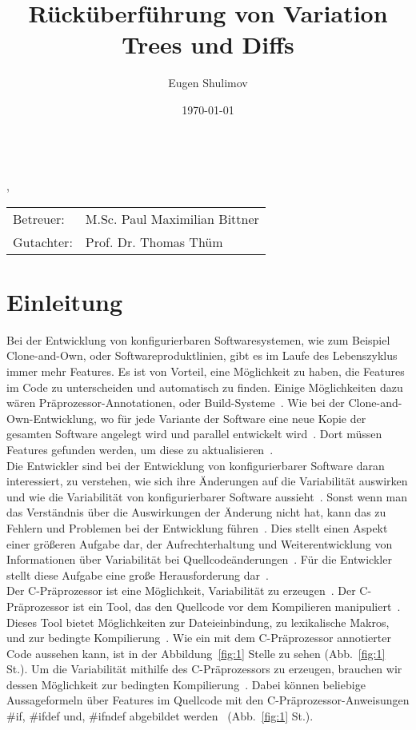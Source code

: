\documentclass[11pt,a4paper,oneside]{article}
\title{Rücküberführung von Variation Trees und Diffs}
\author{Eugen Shulimov}
\date{\today}
\newcommand*\numcircledtikz[1]{\tikz[baseline=(char.base)]{
		\node[circle,draw,double,inner sep=1.2pt] (char) {#1};}}
\begin{document}
	\makeatletter
	\begin{center}
		{\large\@title}\\
		\@author, \@date
	\end{center}
	\makeatother
	\vspace*{10pt}
	\begin{tabular}{ll}
		Betreuer:& M.Sc. Paul Maximilian Bittner\\
		Gutachter:& Prof. Dr. Thomas Thüm
	\end{tabular}

	\vspace{20pt}
	\section{Einleitung}
	Bei der Entwicklung von konfigurierbaren Softwaresystemen, wie zum Beispiel Clone-and-Own, oder Softwareproduktlinien, gibt es im Laufe des Lebenszyklus immer mehr Features. Es ist von Vorteil, eine Möglichkeit zu haben, die Features im Code zu unterscheiden und automatisch zu finden. Einige Möglichkeiten dazu wären Präprozessor-Annotationen, oder Build-Systeme~\cite{ABKS13}. Wie bei der Clone-and-Own-Entwicklung, wo für jede Variante der Software eine neue Kopie der gesamten Software angelegt wird und parallel entwickelt wird~\cite{BTS+:ESECFSE22}. Dort müssen Features gefunden werden, um diese zu aktualisieren~\cite{BTS+:ESECFSE22,KTSB:ICSE21,KB:VaMoS20,KB:ESECFSE20,KKK+:SPLC18,ZSL+:ICSE18}.\\
	
	
	
	Die Entwickler sind bei der Entwicklung von konfigurierbarer Software daran interessiert, zu verstehen, wie sich ihre Änderungen auf die Variabilität auswirken und wie die Variabilität von konfigurierbarer Software aussieht~\cite{BTS+:ESECFSE22}. Sonst wenn man das Verständnis über die Auswirkungen der Änderung nicht hat, kann das zu Fehlern und Problemen bei der Entwicklung führen~\cite{BTS+:ESECFSE22,NBA+:JSS15, NST+:SoSyM22,SBT:JSS19, SNB+:VaMoS21,KATS:TOSEM12}. Dies stellt einen Aspekt einer größeren Aufgabe dar, der Aufrechterhaltung und Weiterentwicklung von Informationen über Variabilität bei Quellcodeänderungen~\cite{BTS+:ESECFSE22}. Für die Entwickler stellt diese Aufgabe eine große Herausforderung dar~\cite{BTS+:ESECFSE22,PCA+:VAMOS13, PTD+:EMSE16, SHA:SPLC12}.\\
	
	
	Der C-Präprozessor ist eine Möglichkeit, Variabilität zu erzeugen~\cite{ABKS13}. Der C-Präprozessor ist ein Tool, das den Quellcode vor dem Kompilieren manipuliert~\cite{ABKS13}. Dieses Tool bietet Möglichkeiten zur Dateieinbindung, zu lexikalische Makros, und zur bedingte Kompilierung~\cite{ABKS13}. Wie ein mit dem  C-Präprozessor annotierter Code aussehen kann, ist in der Abbildung~\ref{fig:1} Stelle \numcircledtikz{v} zu sehen (Abb.~\ref{fig:1} St.\numcircledtikz{v}). Um die Variabilität mithilfe des C-Präprozessors zu erzeugen, brauchen wir dessen Möglichkeit zur bedingten Kompilierung~\cite{ABKS13}. Dabei können beliebige Aussageformeln über Features im Quellcode mit den C-Präprozessor-Anweisungen \#if, \#ifdef und, \#ifndef abgebildet werden~\cite{BTS+:ESECFSE22} (Abb.~\ref{fig:1} St.\numcircledtikz{v}).\\
	
\end{document}

